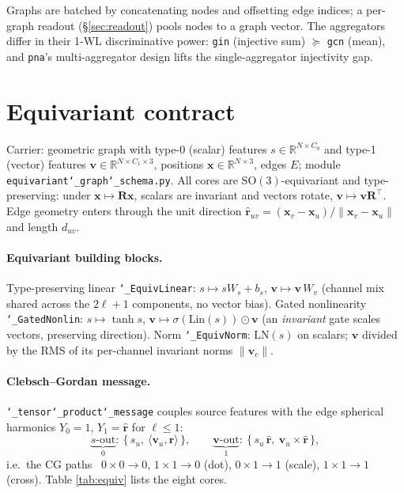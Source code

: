 \documentclass[11pt]{article}
\newcommand{\allowbreakhere}{\discretionary{}{}{}}
\newcommand{\code}[1]{\texttt{\def\_{\char`_\allowbreakhere}#1}}
\newcommand{\R}{\mathbb{R}}
\newcommand{\sig}{\sigma}
\newcommand{\rhat}{\hat{\bm{r}}}
\newcommand{\SO}{\mathrm{SO}(3)}
\begin{document}
\noindent Graphs are batched by concatenating nodes and offsetting edge indices; a per-graph readout
(\S\ref{sec:readout}) pools nodes to a graph vector. The aggregators differ in their 1-WL discriminative
power: \code{gin} (injective sum) $\succeq$ \code{gcn} (mean), and \code{pna}'s multi-aggregator design lifts
the single-aggregator injectivity gap.

\section{Equivariant contract}
\label{sec:equiv}

Carrier: geometric graph with type-0 (scalar) features $s\in\R^{N\times C_0}$ and type-1 (vector) features
$\bm v\in\R^{N\times C_1\times 3}$, positions $\bm x\in\R^{N\times 3}$, edges $E$; module
\code{equivariant\_graph\_schema.py}. All cores are $\SO$-equivariant and type-preserving:
under $\bm x\mapsto \mathbf{R}\bm x$, scalars are invariant and vectors rotate, $\bm v\mapsto \bm v\mathbf{R}^\top$.
Edge geometry enters through the unit direction $\rhat_{uv}=(\bm x_v-\bm x_u)/\lVert\bm x_v-\bm x_u\rVert$ and
length $d_{uv}$.

\paragraph{Equivariant building blocks.} Type-preserving linear \code{\_EquivLinear}: $s\mapsto sW_s+b_s$,
$\bm v\mapsto \bm v\,W_v$ (channel mix shared across the $2\ell{+}1$ components, no vector bias). Gated
nonlinearity \code{\_GatedNonlin}: $s\mapsto\tanh s$, $\bm v\mapsto \sig(\text{Lin}(s))\odot\bm v$ (an
\emph{invariant} gate scales vectors, preserving direction). Norm \code{\_EquivNorm}: $\mathrm{LN}(s)$ on
scalars; $\bm v$ divided by the RMS of its per-channel invariant norms $\lVert\bm v_c\rVert$.

\paragraph{Clebsch--Gordan message.} \code{\_tensor\_product\_message} couples source features with the edge
spherical harmonics $Y_0{=}1,\,Y_1{=}\rhat$ for $\ell\le1$:
\begin{equation}
\label{eq:cg}
\underbrace{s\text{-out}}_{0}\!:\ \{\,s_u,\ \langle \bm v_u,\rhat\rangle\,\},\qquad
\underbrace{\bm v\text{-out}}_{1}\!:\ \{\,s_u\,\rhat,\ \bm v_u\times\rhat\,\},
\end{equation}
i.e.\ the CG paths~\cite{thomas2018tfn,geiger2022e3nn} $0{\times}0{\to}0$, $1{\times}1{\to}0$ (dot), $0{\times}1{\to}1$ (scale), $1{\times}1{\to}1$
(cross). Table \ref{tab:equiv} lists the eight cores.
\end{document}
